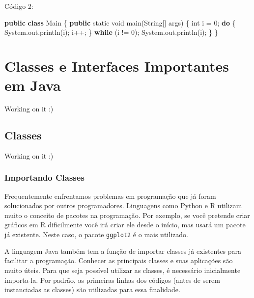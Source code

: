 \documentclass[
]{book}
\newenvironment{Shaded}{\begin{snugshade}}{\end{snugshade}}
\newcommand{\BuiltInTok}[1]{#1}
\newcommand{\DataTypeTok}[1]{\textcolor[rgb]{0.13,0.29,0.53}{#1}}
\newcommand{\DecValTok}[1]{\textcolor[rgb]{0.00,0.00,0.81}{#1}}
\newcommand{\FunctionTok}[1]{\textcolor[rgb]{0.00,0.00,0.00}{#1}}
\newcommand{\KeywordTok}[1]{\textcolor[rgb]{0.13,0.29,0.53}{\textbf{#1}}}
\newcommand{\NormalTok}[1]{#1}
\begin{document}
Código 2:

\begin{Shaded}
\begin{Highlighting}[]
\KeywordTok{public} \KeywordTok{class}\NormalTok{ Main \{}
    \KeywordTok{public} \DataTypeTok{static} \DataTypeTok{void} \FunctionTok{main}\NormalTok{(}\BuiltInTok{String}\NormalTok{[] args) \{}
        \DataTypeTok{int}\NormalTok{ i = }\DecValTok{0}\NormalTok{;}
        \KeywordTok{do}\NormalTok{ \{}
            \BuiltInTok{System}\NormalTok{.}\FunctionTok{out}\NormalTok{.}\FunctionTok{println}\NormalTok{(i);}
\NormalTok{            i++;}
\NormalTok{        \} }\KeywordTok{while}\NormalTok{ (i != }\DecValTok{0}\NormalTok{);}
        \BuiltInTok{System}\NormalTok{.}\FunctionTok{out}\NormalTok{.}\FunctionTok{println}\NormalTok{(i);}
\NormalTok{    \}}
\NormalTok{\}}
\end{Highlighting}
\end{Shaded}

\hypertarget{classes-e-interfaces-importantes-em-java}{%
\chapter{Classes e Interfaces Importantes em Java}\label{classes-e-interfaces-importantes-em-java}}

Working on it :)

\hypertarget{classes-1}{%
\section{Classes}\label{classes-1}}

Working on it :)

\hypertarget{importando-classes}{%
\subsection{Importando Classes}\label{importando-classes}}

Frequentemente enfrentamos problemas em programação que já foram solucionados por outros programadores. Linguagens como Python e R utilizam muito o conceito de pacotes na programação. Por exemplo, se você pretende criar gráficos em R dificilmente você irá criar ele desde o início, mas usará um pacote já existente. Neste caso, o pacote \texttt{ggplot2} é o mais utilizado.

A linguagem Java também tem a função de importar classes já existentes para facilitar a programação. Conhecer as principais classes e suas aplicações são muito úteis. Para que seja possível utilizar as classes, é necessário inicialmente importa-la. Por padrão, as primeiras linhas dos códigos (antes de serem instanciadas as classes) são utilizadas para essa finalidade.
\end{document}
